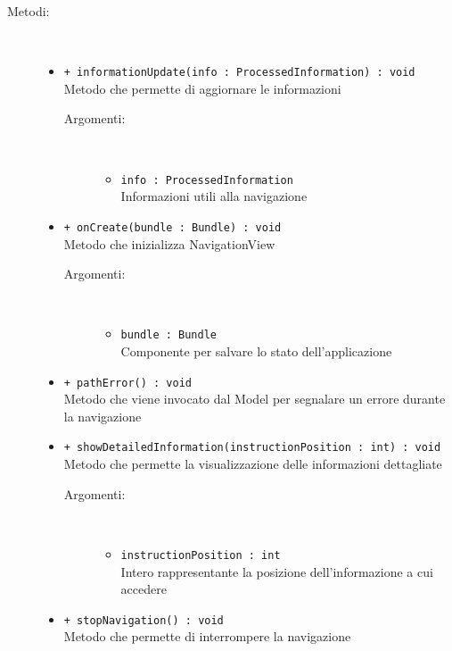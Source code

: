 \documentclass[../DefinizioneDiProdotto.tex]{subfiles}
\begin{document}
\begin{description}
\begin{itemize}
\end{itemize}
\item[Metodi:] \
\begin{itemize}
\item \texttt{+ informationUpdate(info : ProcessedInformation) : void}\\
Metodo che permette di aggiornare le informazioni
 \begin{description}
\item[Argomenti:] \
\begin{itemize}
\item \texttt{info : ProcessedInformation}\\
Informazioni utili alla navigazione\end{itemize}
\end{description}
\item \texttt{+ onCreate(bundle : Bundle) : void}\\
Metodo che inizializza NavigationView
 \begin{description}
\item[Argomenti:] \
\begin{itemize}
\item \texttt{bundle : Bundle}\\
Componente per salvare lo stato dell'applicazione\end{itemize}
\end{description}
\item \texttt{+ pathError() : void}\\
Metodo che viene invocato dal Model per segnalare un errore durante la navigazione
 \item \texttt{+ showDetailedInformation(instructionPosition : int) : void}\\
Metodo che permette la visualizzazione delle informazioni dettagliate
 \begin{description}
\item[Argomenti:] \
\begin{itemize}
\item \texttt{instructionPosition : int}\\
Intero rappresentante la posizione dell'informazione a cui accedere\end{itemize}
\end{description}
\item \texttt{+ stopNavigation() : void}\\
Metodo che permette di interrompere la navigazione
 \end{itemize}
\end{description}
\end{document}
